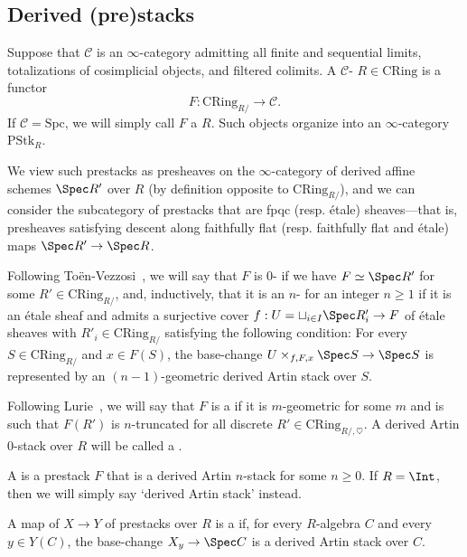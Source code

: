 \documentclass[10pt]{amsart}
\begin{document}
\subsection{Derived (pre)stacks}

Suppose that $\mathcal{C}$ is an $\infty$-category admitting all finite and sequential limits, totalizations of cosimplicial objects, and filtered colimits. A $\mathcal{C}$- $R\in \mathrm{CRing}$ is a functor
\[
F:\mathrm{CRing}_{R/}\to \mathcal{C}.
\]
If $\mathcal{C} = \mathrm{Spc}$,  we will simply call $F$ a  $R$. Such objects organize into an $\infty$-category $\mathrm{PStk}_R$.

We view such prestacks as presheaves on the $\infty$-category of derived affine schemes $\Spec R'$ over $R$ (by definition opposite to $\mathrm{CRing}_{R/}$), and we can consider the subcategory of prestacks that are fpqc (resp. \'etale) sheaves---that is, presheaves satisfying descent along faithfully flat (resp. faithfully flat and \'etale) maps $\Spec R'\to \Spec R$.

\begin{definition}
\label{defn:artin_stacks}
Following To\"en-Vezzosi~\cite{TV2}, we will say that $F$ is $0$- if we have $F \simeq \Spec R'$ for some $R'\in \mathrm{CRing}_{R/}$, and, inductively, that it is an $n$- for an integer $n\ge 1$ if it is an \'etale sheaf and admits a surjective cover $f:U = \sqcup_{i\in I}\Spec R'_i\to F$ of \'etale sheaves with $R'_i\in \mathrm{CRing}_{R/}$ satisfying the following condition: For every $S\in \mathrm{CRing}_{R/}$ and $x\in F(S)$, the base-change $U\times_{f,F,x}\Spec S\to \Spec S$ is represented by an $(n-1)$-geometric derived Artin stack over $S$. 

Following Lurie~\cite[\S 5]{lurie_thesis}, we will say that $F$ is a  if it is $m$-geometric for some $m$ and is such that $F(R')$ is $n$-truncated for all discrete $R'\in \mathrm{CRing}_{R/,\heartsuit}$. A derived Artin $0$-stack over $R$ will be called a .

A  is a prestack $F$ that is a derived Artin $n$-stack for some $n\ge 0$. If $R = \Int$, then we will simply say `derived Artin stack' instead.

A map of $X\to Y$ of prestacks over $R$ is a  if, for every $R$-algebra $C$ and every $y\in Y(C)$, the base-change $X_y\to \Spec C$ is a derived Artin stack over $C$.
\end{definition}
\end{document}

